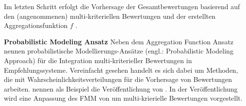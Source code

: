 Im letzten Schritt erfolgt die Vorhersage der Gesamtbewertungen basierend auf den (angenommenen) multi-kriteriellen Bewertungen und der erstellten Aggregationsfunktion $f$ \cite[S. 861]{adomavicius:4:inbook}.

\textbf{Probabilistic Modeling Ansatz}
Neben dem Aggregation Function Ansatz nennen \textcite[S. 861]{adomavicius:4:inbook} probabilistische Modellierungs-Ansätze (engl.: Probabilistic Modeling Approach) für die Integration multi-kriterieller Bewertungen in Empfehlungssysteme.
Vereinfacht gesehen handelt es sich dabei um Methoden, die mit Wahrscheinlichkeitsverteilungen für die Vorhersage von Bewertungen arbeiten.
\textcite[S. 861]{adomavicius:4:inbook} nennen als Beispiel die Veröffentlichung von \textcite[S. 231]{sahoo:article}.
In der Veröffentlichung wird eine Anpassung des \ac{FMM} von \textcite[S. 704ff.]{si:inproceedings} um multi-krierielle Bewertungen vorgestellt.

